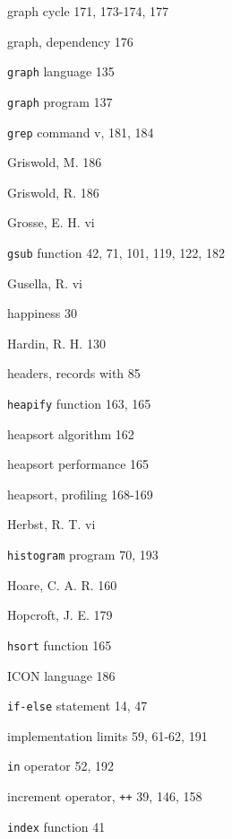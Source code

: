 \begin{multicols}{3}
\hangindent=4pc  graph cycle 171, 173-174, 177

\hangindent=4pc  graph, dependency 176

\hangindent=4pc  \verb'graph' language 135

\hangindent=4pc  \verb'graph' program 137

\hangindent=4pc  \verb'grep' command v, 181, 184

\hangindent=4pc  Griswold, M. 186

\hangindent=4pc  Griswold, R. 186

\hangindent=4pc  Grosse, E. H. vi

\hangindent=4pc  \verb'gsub' function 42, 71, 101, 119, 122, 182

\hangindent=4pc  Gusella, R. vi

\hangindent=4pc  happiness 30

\hangindent=4pc  Hardin, R. H. 130

\hangindent=4pc  headers, records with 85

\hangindent=4pc  \verb'heapify' function 163, 165

\hangindent=4pc  heapsort algorithm 162

\hangindent=4pc  heapsort performance 165

\hangindent=4pc  heapsort, profiling 168-169

\hangindent=4pc  Herbst, R. T. vi

\hangindent=4pc  \verb'histogram' program 70, 193

\hangindent=4pc  Hoare, C. A. R. 160

\hangindent=4pc  Hopcroft, J. E. 179

\hangindent=4pc  \verb'hsort' function 165

\hangindent=4pc  ICON language 186

\hangindent=4pc  \verb'if-else' statement 14, 47

\hangindent=4pc  implementation limits 59, 61-62, 191

\hangindent=4pc  \verb'in' operator 52, 192

\hangindent=4pc  increment operator, \verb'++' 39, 146, 158

\hangindent=4pc  \verb'index' function 41


\end{multicols}
